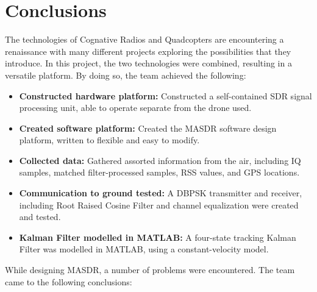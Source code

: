 \chapter{Conclusions}
The technologies of Cognative Radios and Quadcopters are encountering a renaissance
with many different projects exploring the possibilities that they introduce. In this project,
the two technologies were combined, resulting in a versatile platform. By doing so, 
the team achieved the following:
\begin{itemize} 
 \item \textbf{Constructed hardware platform: }Constructed a self-contained SDR signal processing
                unit, able to operate separate from the drone used.
 \item \textbf{Created software platform: }Created the MASDR software design platform,
                written to flexible and easy to modify. 
 \item \textbf{Collected data: }Gathered assorted information from the air, including 
                IQ samples, matched filter-processed samples, RSS values, and GPS locations.
 \item \textbf{Communication to ground tested: }A DBPSK transmitter and receiver, 
                including Root Raised Cosine Filter and channel equalization were created and tested. 
 \item \textbf{Kalman Filter modelled in MATLAB: }A four-state tracking Kalman Filter
                was modelled in MATLAB, using a constant-velocity model.
\end{itemize} \par
While designing MASDR, a number of problems were encountered. The team came to the following 
conclusions:
